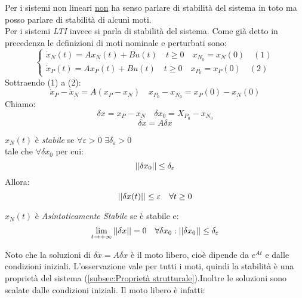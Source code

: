 	Per i sistemi non lineari \underline{non} ha senso parlare di stabilità del sistema in toto ma posso parlare di stabilità di alcuni moti.\\
	Per i sistemi \emph{LTI} invece si parla di stabilità del sistema. Come già detto in precedenza le definizioni di moti nominale e perturbati sono:
	\begin{equation*}
		\begin{cases*}
			\dot{x}_N(t) = Ax_N(t)+ Bu(t) \quad t \geq0 \quad x_{N_0} = x_N(0) \quad (1)\\
			\dot{x}_P(t) = Ax_P(t)+ Bu(t) \quad t \geq0 \quad x_{P_0} = x_P(0) \quad (2)
		\end{cases*}
	\end{equation*}
	Sottraendo (1) a (2):
	\begin{equation*}
		\dot{x}_P -\dot{x}_N = A(x_P-x_N)\quad x_{P_0}-x_{N_0} = x_P(0)-x_N(0) 
	\end{equation*}
	Chiamo:
	\[
	\delta x = x_P -x_N \quad\delta x_0 = X_{P_0} - x_{N_0}
	\]
	\[
	\boxed{	\delta \dot{x} = A\delta x}
	\]
	\begin{table}[H]
		\centering
		\begin{minipage}[t]{0.4\textwidth}
			$ x_N(t) $ è \emph{stabile} se $ \forall\varepsilon>0\,\, \exists \delta_\varepsilon>0$ \\tale che $ \forall\delta x_0 $ per cui:\[||\delta x_0||\leq\delta_\varepsilon\]
			Allora:\[||\delta x(t)||\leq\varepsilon\quad\forall t\geq 0\]
		\end{minipage}
		\vline
		\hspace{2ex}
		\begin{minipage}[t]{0.4\textwidth}
			$ x_N(t) $ è \emph{Asintoticamente Stabile} se è stabile e:
			\[\lim_{t\to+\infty}||\delta x|| = 0 \quad \forall\delta x_0 : ||\delta x_0 ||\leq\delta_\varepsilon\]
		\end{minipage}
		
	\end{table}
	Noto che la soluzioni di $ \delta\dot{x} = A\delta x $ è il moto libero, cioè dipende da $ e^{At} $ e dalle condizioni iniziali. L'osservazione vale per tutti i moti, quindi la stabilità è una proprietà del sistema (\cref*{subsec:Proprietà strutturale}).Inoltre le soluzioni sono scalate dalle condizioni iniziali. Il moto libero è infatti:\\
